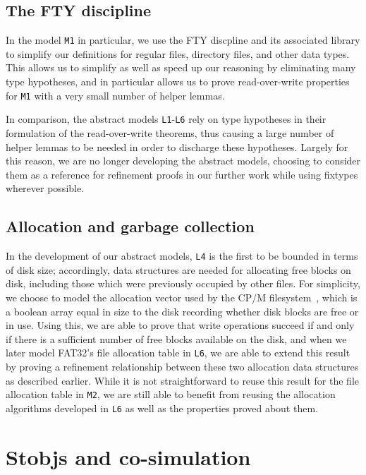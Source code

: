 \documentclass[submission,copyright,creativecommons]{eptcs}
\begin{document}
\subsection{The FTY discipline}

In the model \texttt{M1} in particular, we use the FTY discpline and
its associated library \cite{15-swords-fty} to simplify our
definitions for regular files,
directory files, and other data types. This allows us to simplify as
well as speed up our reasoning by eliminating many type hypotheses,
and in particular allows us to prove read-over-write properties for
\texttt{M1} with a very small number of helper lemmas.

In comparison, the abstract models \texttt{L1}-\texttt{L6} rely on
type hypotheses in their formulation of the read-over-write theorems,
thus causing a large  number of helper lemmas to be needed in order to
discharge these hypotheses. Largely for this reason, we are no longer
developing the abstract models, choosing to consider them as a
reference for refinement proofs in our further work while using
fixtypes wherever possible.

\subsection{Allocation and garbage collection}

In the development of our abstract models, \texttt{L4} is the first to
be bounded in terms of disk size; accordingly, data structures are
needed for allocating free blocks on disk, including those which were
previously occupied by other files. For simplicity, we choose to model
the allocation vector used by the CP/M filesystem~\cite{moriacpm},
which is a boolean
array equal in size to the disk recording whether disk blocks are free
or in use. Using this, we are able to prove that write operations
succeed if and only if there is a sufficient number of free blocks
available on the disk, and when we later model FAT32's file allocation
table in \texttt{L6}, we are able to extend this result by proving a
refinement relationship between these two allocation data structures
as described earlier. While it is not straightforward to reuse this
result for the file allocation table in \texttt{M2}, we are still able
to benefit from reusing the allocation algorithms developed in
\texttt{L6} as well as the properties proved about them.

\section{Stobjs and co-simulation}
\end{document}
